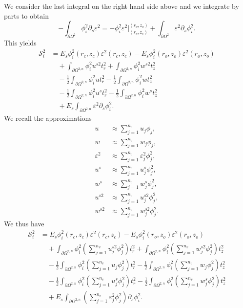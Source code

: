 \documentclass{article}
\begin{document}
We consider the last integral on the right hand side above and we integrate by parts to obtain
\begin{equation}
- \int_{\partial \Omega^{2}} \phi_i^2 \partial_s \varepsilon^2 = - \phi_i^2 \varepsilon^2 \Big|_{(r_c,z_c)}^{(r_o,z_o)} + \int_{\partial \Omega^{2}} \varepsilon^2 \partial_s \phi_i^2. \tag{7.7}
\end{equation}
This yields
\begin{align}
\mathcal{S}_i^2 &= E_s \phi_i^2(r_c,z_c) \varepsilon^2(r_c,z_c) - E_s \phi_i^2(r_o,z_o) \varepsilon^2(r_o,z_o) \nonumber\\
&\quad + \int_{\partial \Omega^{2,n}} \phi_i^2 u^{s2} t_r^2 + \int_{\partial \Omega^{2,n}} \phi_i^2 w^{s2} t_z^2 \nonumber\\
&\quad - \frac{1}{2} \int_{\partial \Omega^{2,n}} \phi_i^2 u t_r^2 - \frac{1}{2} \int_{\partial \Omega^{2,n}} \phi_i^2 w t_z^2 \nonumber\\
&\quad - \frac{1}{2} \int_{\partial \Omega^{2,n}} \phi_i^2 u^s t_r^2 - \frac{1}{2} \int_{\partial \Omega^{2,n}} \phi_i^2 w^s t_z^2 \nonumber\\
&\quad + E_s \int_{\partial \Omega^{2,n}} \varepsilon^2 \partial_s \phi_i^2. \tag{7.8}
\end{align}
We recall the approximations
\begin{align}
u &\approx \sum_{j=1}^{n_v} u_j \phi_j, \tag{7.9} \\
w &\approx \sum_{j=1}^{n_v} w_j \phi_j, \tag{7.10} \\
\varepsilon^2 &\approx \sum_{j=1}^{n_v} \varepsilon_j^2 \phi_j^2, \tag{7.11} \\
u^s &\approx \sum_{j=1}^{n_v} u_j^s \phi_j^2, \tag{7.12} \\
w^s &\approx \sum_{j=1}^{n_v} w_j^s \phi_j^2, \tag{7.13} \\
u^{s2} &\approx \sum_{j=1}^{n_v} u_j^{s2} \phi_j^2, \tag{7.14} \\
w^{s2} &\approx \sum_{j=1}^{n_v} w_j^{s2} \phi_j^2. \tag{7.15}
\end{align}
We thus have
\begin{align}
\mathcal{S}_i^2 &= E_s \phi_i^2(r_c,z_c) \varepsilon^2(r_c,z_c) - E_s \phi_i^2(r_o,z_o) \varepsilon^2(r_o,z_o) \nonumber\\
&\quad + \int_{\partial \Omega^{2,n}} \phi_i^2 \left( \sum_{j=1}^{n_v} u_j^{s2} \phi_j^2 \right) t_r^2 + \int_{\partial \Omega^{2,n}} \phi_i^2 \left( \sum_{j=1}^{n_v} w_j^{s2} \phi_j^2 \right) t_z^2 \nonumber\\
&\quad - \frac{1}{2} \int_{\partial \Omega^{2,n}} \phi_i^2 \left( \sum_{j=1}^{n_v} u_j \phi_j^2 \right) t_r^2 - \frac{1}{2} \int_{\partial \Omega^{2,n}} \phi_i^2 \left( \sum_{j=1}^{n_v} w_j \phi_j^2 \right) t_z^2 \nonumber\\
&\quad - \frac{1}{2} \int_{\partial \Omega^{2,n}} \phi_i^2 \left( \sum_{j=1}^{n_v} u_j^s \phi_j^2 \right) t_r^2 - \frac{1}{2} \int_{\partial \Omega^{2,n}} \phi_i^2 \left( \sum_{j=1}^{n_v} w_j^s \phi_j^2 \right) t_z^2 \nonumber\\
&\quad + E_s \int_{\partial \Omega^{2,n}} \left( \sum_{j=1}^{n_v} \varepsilon_j^2 \phi_j^2 \right) \partial_s \phi_i^2. \tag{7.16}
\end{align}
\end{document}
